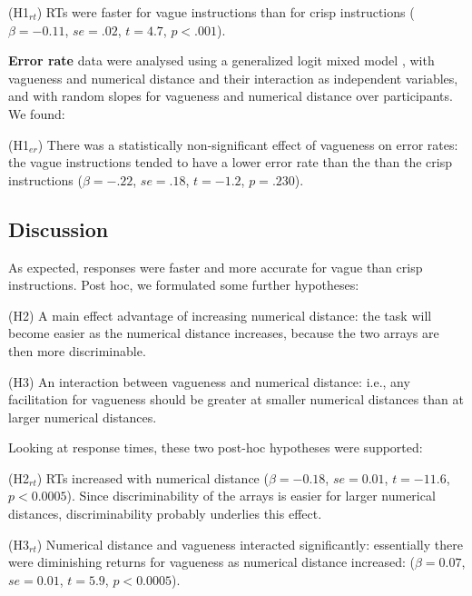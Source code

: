 \documentclass[%
man,		%
floatsintext,%
apacite%
]{apa6}
\begin{document}
{\small
\begin{APAenumerate}
	\item [(H1$_{rt}$)] RTs were faster for vague instructions than for crisp instructions 
	($\beta=-0.11$, $se=.02$, $t=4.7$, $p<.001$).  %
\end{APAenumerate}
}

{\bf Error rate} data were analysed using a generalized logit mixed model \cite{jaeger2008categorical}, with vagueness and numerical distance and their interaction as independent variables, and with random slopes for vagueness and numerical distance over participants. We found:

{\small
\begin{APAenumerate}
	\item [(H1$_{er}$)] There was a statistically non-significant effect of vagueness on error rates: the vague instructions tended to have a lower error rate than the than the crisp instructions 
	($\beta=-.22$, $se=.18$, $t=-1.2$, $p=.230$).  %
\end{APAenumerate}
}

\subsection{Discussion}

\noindent As expected, responses were faster and more accurate for vague than crisp instructions. Post hoc, we formulated some further hypotheses:

{\small
\begin{APAenumerate}
	\item [(H2)] A main effect advantage of increasing numerical distance: the task will become easier as the numerical distance increases, because the two arrays are then more discriminable.
	\item [(H3)] An interaction between vagueness and numerical distance: i.e., any facilitation for vagueness should be greater at smaller numerical distances than at larger numerical distances.
\end{APAenumerate}
}

Looking at response times, these two post-hoc hypotheses were supported:

{\small
\begin{APAenumerate}
	\item [(H2$_{rt}$)] RTs increased with numerical distance 
	($\beta=-0.18$, $se=0.01$, $t=-11.6$, $p<0.0005$). %
	Since discriminability of the arrays is easier for larger numerical distances, discriminability probably underlies this effect. 
	\item [(H3$_{rt}$)] Numerical distance and vagueness interacted significantly: essentially there were diminishing returns for vagueness as numerical distance increased: 
	($\beta=0.07$, $se=0.01$, $t=5.9$, $p<0.0005$). %
\end{APAenumerate}
}
\end{document}
